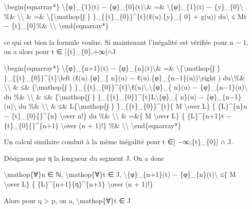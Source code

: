 \documentclass[]{article}
\begin{document}
\textbackslash{}begin\{eqnarray*\}
\textbackslash{}\textbar{}\{φ\}\_\{1\}(t) −
\{φ\}\_\{0\}(t)\textbackslash{}\textbar{}\& =\&
\textbackslash{}\textbar{}\{φ\}\_\{1\}(t) −
\{y\}\_\{0\}\textbackslash{}\textbar{} \%\&
\textbackslash{}\textbackslash{} \& =\&
\textbackslash{}\textbar{}\{\textbackslash{}mathop\{∫ \}
\}\_\{\{t\}\_\{0\}\}\^{}\{t\}(ℓ(u).\{y\}\_\{ 0\} + g(u))
du\textbackslash{}\textbar{} ≤ M\textbar{}t − \{t\}\_\{0\}\textbar{}\%\&
\textbackslash{}\textbackslash{} \textbackslash{}end\{eqnarray*\}

ce qui est bien la formule voulue. Si maintenant l'inégalité est
vérifiée pour n − 1, on a alors pour t ∈ {[}\{t\}\_\{0\},+∞{[}∩J

\textbackslash{}begin\{eqnarray*\}
\textbackslash{}\textbar{}\{φ\}\_\{n+1\}(t) −
\{φ\}\_\{n\}(t)\textbackslash{}\textbar{}\& =\&
\textbackslash{}\textbar{}\{\textbackslash{}mathop\{∫ \}
\}\_\{\{t\}\_\{0\}\}\^{}\{t\}\textbackslash{}left (ℓ(u).\{φ\}\_\{ n\}(u)
− ℓ(u).\{φ\}\_\{n−1\}(u))\textbackslash{}right )
du\textbackslash{}\textbar{}\%\& \textbackslash{}\textbackslash{} \& ≤\&
\{\textbackslash{}mathop\{∫ \}
\}\_\{\{t\}\_\{0\}\}\^{}\{t\}\textbackslash{}\textbar{}ℓ(u)\textbackslash{}\textbar{}.\textbackslash{}\textbar{}\{φ\}\_\{
n\}(u) − \{φ\}\_\{n−1\}(u)\textbackslash{}\textbar{} du \%\&
\textbackslash{}\textbackslash{} \& ≤\& \{\textbackslash{}mathop\{∫ \}
\}\_\{\{t\}\_\{0\}\}\^{}\{t\}L\textbackslash{}\textbar{}\{φ\}\_\{ n\}(u)
− \{φ\}\_\{n−1\}(u)\textbackslash{}\textbar{} du \%\&
\textbackslash{}\textbackslash{} \& ≤\& L\{\textbackslash{}mathop\{∫ \}
\}\_\{\{t\}\_\{0\}\}\^{}\{t\}\{ M \textbackslash{}over L\} \{
\{L\}\^{}\{n\}\textbar{}u − \{t\}\_\{0\}\{\textbar{}\}\^{}\{n\}
\textbackslash{}over n!\} du \%\& \textbackslash{}\textbackslash{} \&
=\&\{ M \textbackslash{}over L\} \{ \{L\}\^{}\{n+1\}\textbar{}t −
\{t\}\_\{0\}\{\textbar{}\}\^{}\{n+1\} \textbackslash{}over (n + 1)!\}
\%\& \textbackslash{}\textbackslash{} \textbackslash{}end\{eqnarray*\}

Un calcul similaire conduit à la même inégalité pour t ∈{]}
−∞,\{t\}\_\{0\}{]} ∩ J.

Désignons par η la longueur du segment J. On a donc

\textbackslash{}mathop\{∀\}n ∈ ℕ, \textbackslash{}mathop\{∀\}t ∈ J,
\textbackslash{}\textbar{}\{φ\}\_\{n+1\}(t) −
\{φ\}\_\{n\}(t)\textbackslash{}\textbar{} ≤\{ M \textbackslash{}over L\}
\{ \{L\}\^{}\{n+1\}\{η\}\^{}\{n+1\} \textbackslash{}over (n + 1)!\}

Alors pour q \textgreater{} p, on a, \textbackslash{}mathop\{∀\}t ∈ J
\end{document}
